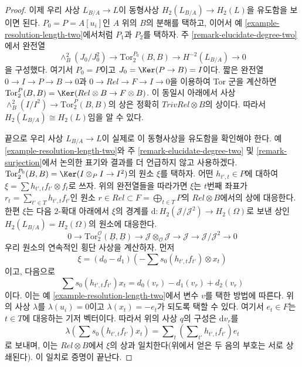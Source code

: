 \begin{proof}
\medskip\noindent
이제 우리 사상 $L_{B/A} \to L$이 동형사상
$H_2(L_{B/A}) \to H_2(L)$을 유도함을 보이면 된다. $P_0 = P = A[u_i]$인
$A$ 위의 $B$의 분해를 택하고, 이어서 예
\ref{example-resolution-length-two}에서처럼 $P_1$과 $P_2$를 택하자. 주
\ref{remark-elucidate-degree-two}에서 완전열
$$
\wedge^2_B(J_0/J_0^2) \to \text{Tor}_2^{P_0}(B, B) \to H^{-2}(L_{B/A}) \to 0
$$
을 구성했다. 여기서 $P_0 = P$이고 $J_0 = \Ker(P \to B) = I$이다. 짧은
완전열 $0 \to I \to P \to B \to 0$과
$0 \to Rel \to F \to I \to 0$을 이용하여 Tor 군을 계산하면
$\text{Tor}_2^P(B, B) = \Ker(Rel \otimes B \to F \otimes B)$.
이 동일시 아래에서 사상
$\wedge^2_B(I/I^2) \to \text{Tor}_2^P(B, B)$의 상은 정확히
$TrivRel \otimes B$의 상이다. 따라서
$H_2(L_{B/A}) \cong H_2(L)$임을 알 수 있다.

\medskip\noindent
끝으로 우리 사상 $L_{B/A} \to L$이 실제로 이 동형사상을 유도함을
확인해야 한다. 예 \ref{example-resolution-length-two}와 주
\ref{remark-elucidate-degree-two} 및 \ref{remark-surjection}에서 논의한
표기와 결과를 더 언급하지 않고 사용하겠다.
$\text{Tor}_2^{P_0}(B, B) = \Ker(I \otimes_P I \to I^2)$의 원소 $\xi$를
택하자. 어떤 $h_{t', t} \in P$에 대하여
$\xi = \sum h_{t', t}f_{t'} \otimes f_t$로 쓰자. 위의 완전열들을 따라가면
$\xi$는 $t$번째 좌표가
$r_t = \sum_{t' \in T} h_{t', t}f_{t'}$인 원소
$r \in Rel \subset F = \bigoplus_{t \in T} P$의 $Rel \otimes B$에서의
상에 대응한다. 한편 $\xi$는 다음 $2$-확대 아래에서 $\xi$의 경계를
$\text{d} : H_2(\mathcal{J}/\mathcal{J}^2) \to H_2(\Omega)$로 보낸 상인
$H_2(L_{B/A}) = H_2(\Omega)$의 원소에 대응한다.
$$
0 \to
\text{Tor}_2^\mathcal{O}(\underline{B}, \underline{B})
\to 
\mathcal{J} \otimes_\mathcal{O} \mathcal{J} \to \mathcal{J}
\to
\mathcal{J}/\mathcal{J}^2 \to 0
$$
우리 원소의 연속적인 횡단 사상을 계산하자. 먼저
$$
\xi = (d_0 - d_1)(- \sum s_0(h_{t', t} f_{t'}) \otimes x_t)
$$
이고, 다음으로
$$
\sum s_0(h_{t', t} f_{t'}) x_t = d_0(v_r) - d_1(v_r) + d_2(v_r)
$$
이다. 이는 예 \ref{example-resolution-length-two}에서 변수 $v$를 택한
방법에 따른다. 위의 사상 $\lambda$를 $\lambda(u_i) = 0$이고
$\lambda(x_t) = - e_t$가 되도록 택할 수 있다. 여기서 $e_t \in F$는
$t \in T$에 대응하는 기저 벡터이다. 따라서 위의 사상 $q$의 구성은
$\text{d}v_r$를
$$
\lambda(\sum s_0(h_{t', t} f_{t'}) x_t) =
\sum\nolimits_t \left(\sum\nolimits_{t'} h_{t', t}f_{t'}\right) e_t
$$
로 보내며, 이는 $Rel \otimes B$에서 $\xi$의 상과 일치한다(위에서 얻은
두 음의 부호는 서로 상쇄된다). 이 일치로 증명이 끝난다.
\end{proof}

